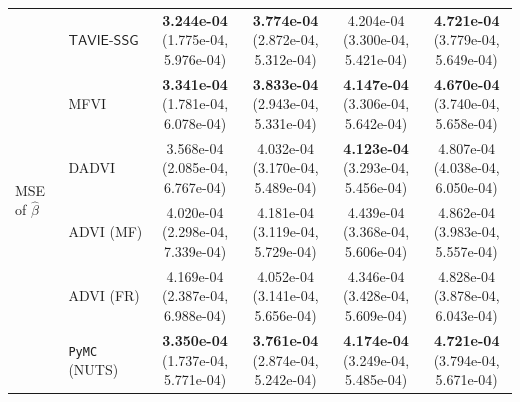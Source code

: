 \documentclass[12pt]{article}
\numberwithin{equation}{section}
\newcommand{\tssg}{\mathsf{TAVIE}\text{-}\mathsf{SSG}}
\begin{document}
{\begin{longtable}{llcccc}
\multirow{6}{*}{MSE of $\widehat{\beta}$}
& $\tssg$ & \makecell[c]{\textbf{3.244e-04}\\(1.775e-04, 5.976e-04)} & \makecell[c]{\textbf{3.774e-04}\\(2.872e-04, 5.312e-04)} & \makecell[c]{4.204e-04\\(3.300e-04, 5.421e-04)} & \makecell[c]{\textbf{4.721e-04}\\(3.779e-04, 5.649e-04)} \\
& MFVI & \makecell[c]{\textbf{3.341e-04}\\(1.781e-04, 6.078e-04)} & \makecell[c]{\textbf{3.833e-04}\\(2.943e-04, 5.331e-04)} & \makecell[c]{\textbf{4.147e-04}\\(3.306e-04, 5.642e-04)} & \makecell[c]{\textbf{4.670e-04}\\(3.740e-04, 5.658e-04)} \\
& DADVI & \makecell[c]{3.568e-04\\(2.085e-04, 6.767e-04)} & \makecell[c]{4.032e-04\\(3.170e-04, 5.489e-04)} & \makecell[c]{\textbf{4.123e-04}\\(3.293e-04, 5.456e-04)} & \makecell[c]{4.807e-04\\(4.038e-04, 6.050e-04)} \\
& ADVI (MF) & \makecell[c]{4.020e-04\\(2.298e-04, 7.339e-04)} & \makecell[c]{4.181e-04\\(3.119e-04, 5.729e-04)} & \makecell[c]{4.439e-04\\(3.368e-04, 5.606e-04)} & \makecell[c]{4.862e-04\\(3.983e-04, 5.557e-04)} \\
& ADVI (FR) & \makecell[c]{4.169e-04\\(2.387e-04, 6.988e-04)} & \makecell[c]{4.052e-04\\(3.141e-04, 5.656e-04)} & \makecell[c]{4.346e-04\\(3.428e-04, 5.609e-04)} & \makecell[c]{4.828e-04\\(3.878e-04, 6.043e-04)} \\
& \texttt{PyMC} (NUTS) & \makecell[c]{\textbf{3.350e-04}\\(1.737e-04, 5.771e-04)} & \makecell[c]{\textbf{3.761e-04}\\(2.874e-04, 5.242e-04)} & \makecell[c]{\textbf{4.174e-04}\\(3.249e-04, 5.485e-04)} & \makecell[c]{\textbf{4.721e-04}\\(3.794e-04, 5.671e-04)} \\
\hline


\end{longtable}}
\end{document}
